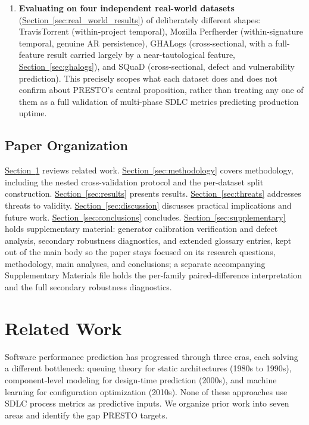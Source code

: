 \documentclass[technologies,article,submit,pdftex,moreauthors]{Definitions/mdpi}
\begin{document}
\begin{enumerate}
\item
  \textbf{Evaluating on four independent real-world datasets} (\hyperref[sec:real_world_results]{Section~\ref*{sec:real_world_results}}) of deliberately different shapes: TravisTorrent (within-project temporal), Mozilla Perfherder (within-signature temporal, genuine AR persistence), GHALogs (cross-sectional, with a full-feature result carried largely by a near-tautological feature, \hyperref[sec:ghalogs]{Section~\ref*{sec:ghalogs}}), and SQuaD (cross-sectional, defect and vulnerability prediction). This precisely scopes what each dataset does and does not confirm about PRESTO's central proposition, rather than treating any one of them as a full validation of multi-phase SDLC metrics predicting production uptime.
\end{enumerate}

\subsection{Paper Organization}\label{sec:organization}

\hyperref[sec:related_work]{Section~\ref*{sec:related_work}} reviews related work. \hyperref[sec:methodology]{Section~\ref*{sec:methodology}} covers methodology, including the nested cross-validation protocol and the per-dataset split construction. \hyperref[sec:results]{Section~\ref*{sec:results}} presents results. \hyperref[sec:threats]{Section~\ref*{sec:threats}} addresses threats to validity. \hyperref[sec:discussion]{Section~\ref*{sec:discussion}} discusses practical implications and future work. \hyperref[sec:conclusions]{Section~\ref*{sec:conclusions}} concludes. \hyperref[sec:supplementary]{Section~\ref*{sec:supplementary}} holds supplementary material: generator calibration verification and defect analysis, secondary robustness diagnostics, and extended glossary entries, kept out of the main body so the paper stays focused on its research questions, methodology, main analyses, and conclusions; a separate accompanying Supplementary Materials file holds the per-family paired-difference interpretation and the full secondary robustness diagnostics.

\section{Related Work}\label{sec:related_work}

Software performance prediction has progressed through three eras, each solving a different bottleneck: queuing theory for static architectures (1980s to 1990s), component-level modeling for design-time prediction (2000s), and machine learning for configuration optimization (2010s). None of these approaches use SDLC process metrics as predictive inputs. We organize prior work into seven areas and identify the gap PRESTO targets.
\end{document}
